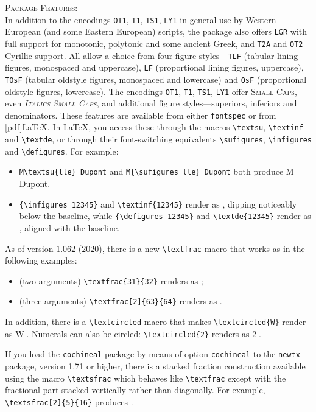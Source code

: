 \documentclass[11pt]{article}
\begin{document}
\textsc{Package Features:}\\
In addition to the encodings {\tt OT1}, {\tt T1}, {\tt TS1}, {\tt LY1} in general use by Western European (and some Eastern European) scripts, the package also offers {\tt LGR} with full support for monotonic, polytonic and some ancient Greek, and {\tt T2A} and {\tt OT2} Cyrillic support. All allow a choice from four figure styles---{\tt TLF} (tabular lining figures, monospaced and uppercase), {\tt LF} (proportional lining figures, uppercase), {\tt TOsF} (tabular oldstyle figures, monospaced and lowercase) and {\tt OsF} (proportional oldstyle figures, lowercase). The encodings {\tt OT1}, {\tt T1}, {\tt TS1}, {\tt LY1} offer \textsc{Small Caps}, even \textsc{\textit{Italics Small Caps}}, and additional figure styles---superiors, inferiors and denominators. These features are available from either \verb|fontspec| or from [pdf]\LaTeX. In \LaTeX, you access these through the macros \verb|\textsu|, \verb|\textinf| and  \verb|\textde|, or through their font-switching equivalents \verb|\sufigures|, \verb|\infigures| and  \verb|\defigures|. For example:
\begin{itemize}
\item
\verb|M\textsu{lle} Dupont| and \verb|M{\sufigures lle} Dupont| both produce M Dupont.
\item \verb|{\infigures 12345}| and \verb|\textinf{12345}| render as , dipping noticeably below the baseline,  while \verb|{\defigures 12345}| and \verb|\textde{12345}| render as , aligned with the baseline.
\end{itemize}
As of version $1.062$ ($2020$), there is a new \verb|\textfrac| macro that works as in the following examples:
\begin{itemize}
\item
(two arguments) \verb|\textfrac{31}{32}| renders as ;
\item
(three arguments) \verb|\textfrac[2]{63}{64}| renders as .
\end{itemize}
In addition, there is a \verb|\textcircled| macro that makes \verb|\textcircled{W}| render as \textcircled{W}. Numerals can also be circled: \verb|\textcircled{2}| renders as \textcircled{2}.

If you load the {\tt cochineal} package by means of option {\tt cochineal} to the {\tt newtx} package, version 1.71 or higher, there is a stacked fraction construction available using the macro \verb|\textsfrac| which behaves like \verb|\textfrac| except with the fractional part stacked vertically rather than diagonally. For example, \verb|\textsfrac[2]{5}{16}| produces .
\end{document}
